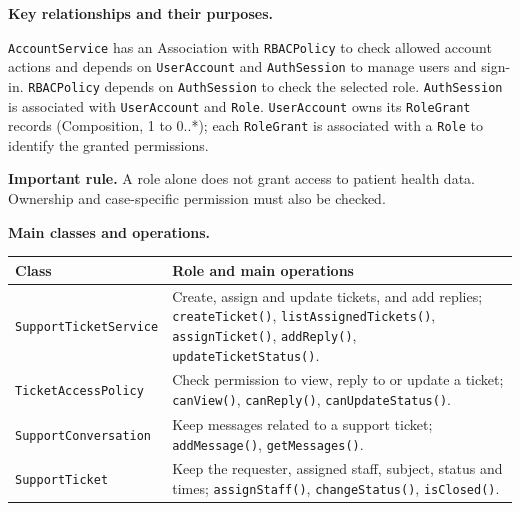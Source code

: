 \documentclass[10pt,letterpaper]{article}
\begin{document}
\noindent\textbf{Key relationships and their purposes.}\par\smallskip
\texttt{AccountService} has an Association with \texttt{RBACPolicy}
to check allowed account actions and depends on \texttt{UserAccount} and
\texttt{AuthSession} to manage users and sign-in. \texttt{RBACPolicy}
depends on \texttt{AuthSession} to check the selected role.
\texttt{AuthSession} is associated with \texttt{UserAccount} and
\texttt{Role}. \texttt{UserAccount} owns its \texttt{RoleGrant}
records (Composition, 1 to 0..*); each \texttt{RoleGrant} is associated
with a \texttt{Role} to identify the granted permissions.

\noindent\textbf{Important rule.} A role alone does not grant access to patient
health data. Ownership and case-specific permission must also be checked.



\noindent\textbf{Main classes and operations.}\par\smallskip
\begingroup\small
\noindent\begin{tabularx}{\textwidth}{|L{0.34\textwidth}|Y|}
\hline
\textbf{Class} & \textbf{Role and main operations} \\ \hline
\texttt{SupportTicketService} & Create, assign and update tickets, and add replies; \texttt{createTicket()}, \texttt{listAssignedTickets()}, \texttt{assignTicket()}, \texttt{addReply()}, \texttt{updateTicketStatus()}. \\ \hline
\texttt{TicketAccessPolicy} & Check permission to view, reply to or update a ticket; \texttt{canView()}, \texttt{canReply()}, \texttt{canUpdateStatus()}. \\ \hline
\texttt{SupportConversation} & Keep messages related to a support ticket; \texttt{addMessage()}, \texttt{getMessages()}. \\ \hline
\texttt{SupportTicket} & Keep the requester, assigned staff, subject, status and times; \texttt{assignStaff()}, \texttt{changeStatus()}, \texttt{isClosed()}. \\ \hline
\end{tabularx}\par
\endgroup
\end{document}
